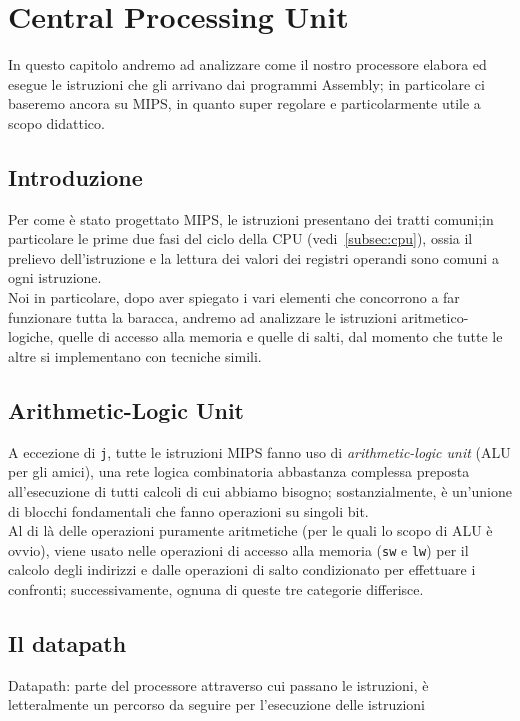 \documentclass[class=book, crop=false, oneside]{standalone}
\begin{document}
\chapter{Central Processing Unit}

In questo capitolo andremo ad analizzare come il nostro processore elabora ed esegue le istruzioni che gli arrivano dai programmi Assembly; in particolare ci baseremo ancora su MIPS, in quanto super regolare e particolarmente utile a scopo didattico.\\

\section{Introduzione}
Per come è stato progettato MIPS, le istruzioni presentano dei tratti comuni;in particolare le prime due fasi del ciclo della CPU (vedi~\ref{subsec:cpu}), ossia il prelievo dell'istruzione e la lettura dei valori dei registri operandi sono comuni a ogni istruzione.\\
Noi in particolare, dopo aver spiegato i vari elementi che concorrono a far funzionare tutta la baracca, andremo ad analizzare le istruzioni aritmetico-logiche, quelle di accesso alla memoria e quelle di salti, dal momento che tutte le altre si implementano con tecniche simili.

\section{Arithmetic-Logic Unit}
A eccezione di \texttt{j}, tutte le istruzioni MIPS fanno uso di \emph{arithmetic-logic unit} (ALU per gli amici), una rete logica combinatoria abbastanza complessa preposta all'esecuzione di tutti calcoli di cui abbiamo bisogno; sostanzialmente, è un’unione di blocchi fondamentali che fanno operazioni su singoli bit.\\
Al di là delle operazioni puramente aritmetiche (per le quali lo scopo di ALU è ovvio), viene usato nelle operazioni di accesso alla memoria (\texttt{sw} e \texttt{lw}) per il calcolo degli indirizzi e dalle operazioni di salto condizionato per effettuare i confronti; successivamente, ognuna di queste tre categorie differisce. \\ 

\section{Il datapath}
Datapath: parte del processore attraverso cui passano le istruzioni, è letteralmente un percorso da seguire per l’esecuzione delle istruzioni\\
\end{document}
